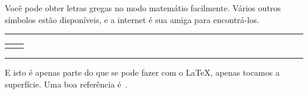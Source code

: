 Você pode obter letras gregas no modo matemátio facilmente. Vários
outros símbolos estão disponíveis, e a internet é sua amiga para
encontrá-los.

\medskip
\begin{center}\hrule\smallskip
\begin{tabular}{c|c}
\begin{minipage}{.405\textwidth}\footnotesize

\end{minipage} &
\begin{minipage}{.535\textwidth}\setlength{\parindent}{1pc}

\end{minipage}
\end{tabular}
\smallskip\hrule
\end{center}
\medskip

E isto é apenas parte do que se pode fazer com o \LaTeX, apenas
tocamos a superfície. Uma boa
referência é~\cite{graetzer00}.

